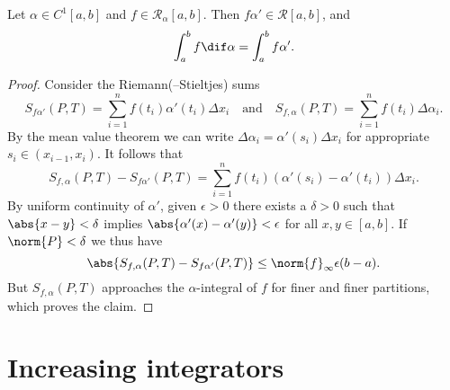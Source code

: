 \documentclass[article, a4paper, 11pt, oneside]{memoir}
\numberwithin{equation}{chapter}
\newcommand{\calR}{\mathcal{R}}
\begin{document}
\begin{proposition}
    Let $\alpha \in C^1[a,b]$ and $f \in \calR_\alpha[a,b]$. Then $f \alpha' \in \calR[a,b]$, and
    \begin{equation*}
        \int_a^b f \dif\alpha
            = \int_a^b f \alpha'.
    \end{equation*}
\end{proposition}

\begin{proof}
    Consider the Riemann(--Stieltjes) sums
    \begin{equation*}
        S_{f\alpha'}(P,T)
            = \sum_{i=1}^n f(t_i) \alpha'(t_i) \Delta x_i
        \quad \text{and} \quad
        S_{f,\alpha}(P,T)
            = \sum_{i=1}^n f(t_i) \Delta \alpha_i.
    \end{equation*}
    By the mean value theorem we can write $\Delta \alpha_i = \alpha'(s_i) \Delta x_i$ for appropriate $s_i \in (x_{i-1}, x_i)$. It follows that
    \begin{equation*}
        S_{f,\alpha}(P,T) - S_{f\alpha'}(P,T)
            = \sum_{i=1}^n f(t_i) (\alpha'(s_i) - \alpha'(t_i)) \Delta x_i.
    \end{equation*}
    By uniform continuity of $\alpha'$, given $\epsilon > 0$ there exists a $\delta > 0$ such that $\abs{x-y} < \delta$ implies $\abs{\alpha'(x) - \alpha'(y)} < \epsilon$ for all $x,y \in [a,b]$. If $\norm{P} < \delta$ we thus have
    \begin{equation*}
        \abs{S_{f,\alpha}(P,T) - S_{f\alpha'}(P,T)}
            \leq \norm{f}_\infty \epsilon (b-a).
    \end{equation*}
    But $S_{f,\alpha}(P,T)$ approaches the $\alpha$-integral of $f$ for finer and finer partitions, which proves the claim.
\end{proof}


\section{Increasing integrators}
\end{document}
